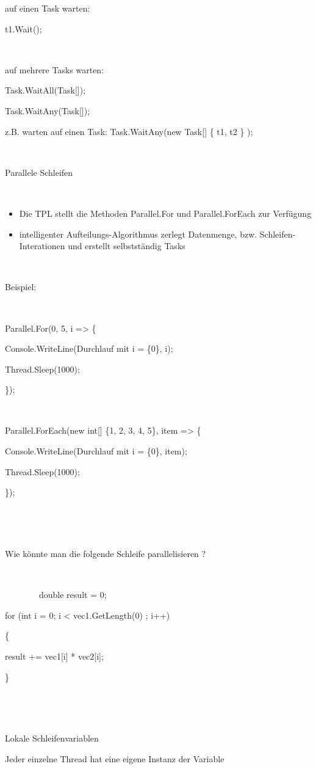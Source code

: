 auf einen Task warten:

t1.Wait();

~

auf mehrere Tasks warten:

Task.WaitAll(Task[]);

Task.WaitAny(Task[]);

z.B. warten auf einen Task: Task.WaitAny(new Task[] \{ t1, t2 \} );

~

Parallele Schleifen

~

\begin{itemize}
\item Die TPL stellt die Methoden Parallel.For und Parallel.ForEach zur Verfügung
\item intelligenter Aufteilungs-Algorithmus zerlegt Datenmenge, bzw. Schleifen-Interationen und erstellt selbstständig Tasks
\end{itemize}
~

Beispiel:

~

 Parallel.For(0,  5,  i ={\textgreater} \{

 Console.WriteLine({\textquotedbl}Durchlauf mit i = \{0\}{\textquotedbl}, i);

 Thread.Sleep(1000);

 \});

~

 Parallel.ForEach(new int[] \{1, 2, 3, 4, 5\}, item ={\textgreater} \{

 Console.WriteLine({\textquotedbl}Durchlauf mit i = \{0\}{\textquotedbl}, item);

 Thread.Sleep(1000);

 \});

~

~

Wie könnte man die folgende Schleife parallelisieren ? 

~

~~~~~~~~double result = 0;

 for (int i = 0; i {\textless} vec1.GetLength(0) ; i++)

 \{

 result += vec1[i] * vec2[i];

 \}

~

~

Lokale Schleifenvariablen

Jeder einzelne Thread hat eine eigene Instanz der Variable

